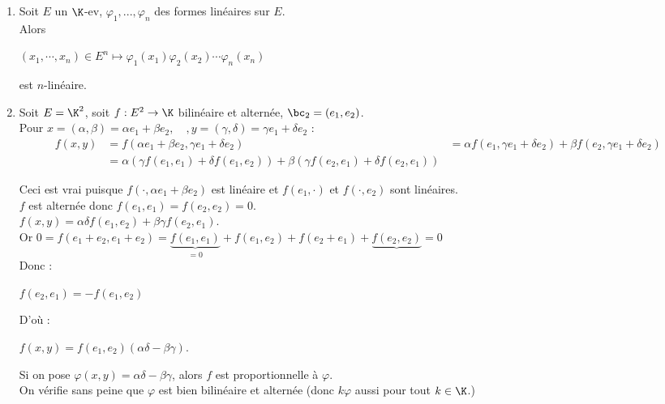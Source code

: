 \documentclass[12pt,a4paper]{report}
\begin{document}
\begin{exemple}[Exemples]{}
\begin{enumerate}
	\item Soit $E$ un $\K$-ev, $\varphi_1,...,\varphi_n$ des formes linéaires sur $E$. \\
	Alors
	\begin{center}
		$(x_1,\cdots,x_n) \in E^n \mapsto \varphi_1(x_1)\varphi_2(x_2)\cdots \varphi_n(x_n)$
	\end{center}
	est $n$-linéaire.
	
	\item Soit $E = \K^2$, soit $f : E^2 \to \K$ bilinéaire et alternée, $\bc_2 = (e_1,e_2)$. \\
	
	Pour $x = (\alpha, \beta) = \alpha e_1+\beta e_2, \quad, y = (\gamma, \delta) = \gamma e_1 + \delta e_2$ :
	\begin{align*}
	f(x,y) &= f(\alpha e_1 + \beta e_2, \gamma e_1 + \delta e_2) &= \alpha f(e_1, \gamma e_1 + \delta e_2) + \beta f(e_2, \gamma e_1 + \delta e_2) \\
	&= \alpha (\gamma f(e_1,e_1) + \delta f(e_1,e_2)) + \beta (\gamma f(e_2,e_1) + \delta f(e_2,e_1))
	\end{align*}
	
	Ceci est vrai puisque $f(\cdot, \alpha e_1 + \beta e_2)$ est linéaire et $f(e_1,\cdot)$ et $f(\cdot, e_2)$ sont linéaires. \\
	
	$f$ est alternée donc $f(e_1,e_1) = f(e_2,e_2) = 0$. \\
	
	$f(x,y) = \alpha \delta f(e_1,e_2) + \beta \gamma f(e_2,e_1)$. \\
	
	Or $0 = f(e_1+e_2,e_1+e_2) = \underbrace{f(e_1,e_1)}_{=0} + f(e_1,e_2) + f(e_2+e_1)+\underbrace{f(e_2,e_2)}{=0}$ \\
	Donc :
	\begin{center}
		$f(e_2,e_1) = -f(e_1,e_2)$
	\end{center}
	
	D'où :
	\begin{center}
		$f(x,y) = f(e_1,e_2)(\alpha \delta - \beta \gamma)$.
	\end{center}
	
	Si on pose $\varphi(x,y) = \alpha \delta - \beta \gamma$, alors $f$ est proportionnelle à $\varphi$. \\
	
	On vérifie sans peine que $\varphi$ est bien bilinéaire et alternée (donc $k\varphi$ aussi pour tout $k \in \K$.)
\end{enumerate}
\end{exemple}
\end{document}
